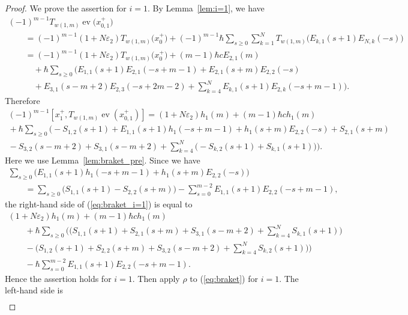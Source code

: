 \documentclass[10pt,a4paper]{amsart}
\theoremstyle{definition}
\numberwithin{equation}{section}
\DeclareMathOperator{\ev}{ev}
\newcommand{\ve}{\varepsilon}
\begin{document}
\begin{proof}We prove the assertion for $i=1$. By Lemma~\ref{lem:i=1}, we have
\begin{gather*}
(-1)^{m-1}T_{w(1,m)}\ev\big(x_{0,1}^+\big) \\
 \qquad{} = (-1)^{m-1}(1+N\ve_2)T_{w(1,m)}\big(x_0^+\big) + (-1)^{m-1}\hbar \sum_{s \geq 0} \sum_{k=1}^N T_{w(1,m)}\big(E_{k,1}(s+1)E_{N,k}(-s)\big) \\
\qquad{} =(-1)^{m-1}(1+N\ve_2)T_{w(1,m)}\big(x_0^+\big) + (m-1)\hbar c E_{2,1}(m)\\
\qquad \quad{} + \hbar \sum_{s \geq 0} \bigg( E_{1,1}(s+1)E_{2,1}(-s+m-1) + E_{2,1}(s+m)E_{2,2}(-s) \\
 \qquad \quad{}+ E_{3,1}(s-m+2)E_{2,3}(-s+2m-2) + \sum_{k=4}^N E_{k,1}(s+1)E_{2,k}(-s+m-1) \bigg).
\end{gather*}
Therefore
\begin{gather}
(-1)^{m-1} [x_1^+, T_{w(1,m)} \ev(x_{0,1}^+)] = (1+N\ve_2)h_1(m) + (m-1)\hbar c h_1(m) \nonumber\\
{}+ \hbar \sum_{s \geq 0} \bigg( {-}S_{1,2}(s+1) + E_{1,1}(s+1)h_1(-s+m-1) + h_1(s+m)E_{2,2}(-s) + S_{2,1}(s+m)\nonumber\\
{}-S_{3,2}(s-m+2) + S_{3,1}(s-m+2) + \sum_{k=4}^N \big( {-}S_{k,2}(s+1) + S_{k,1}(s+1) \big) \bigg). \label{eq:braket_i=1}
\end{gather}
Here we use Lemma~\ref{lem:braket_pre}. Since we have
\begin{gather*}
\sum_{s \geq 0} \big( E_{1,1}(s+1)h_1(-s+m-1) + h_1(s+m)E_{2,2}(-s) \big)\\
\qquad {}=\sum_{s \geq 0} \big( S_{1,1}(s+1)-S_{2,2}(s+m) \big) - \sum_{s=0}^{m-2} E_{1,1}(s+1)E_{2,2}(-s+m-1),
\end{gather*}
the right-hand side of (\ref{eq:braket_i=1}) is equal to
\begin{gather*}
(1+N\ve_2)h_1(m) + (m-1)\hbar c h_1(m) \\
\qquad{} + \hbar \sum_{s \geq 0} \bigg( \bigg( S_{1,1}(s+1) + S_{2,1}(s+m) + S_{3,1}(s-m+2) + \sum_{k=4}^N S_{k,1}(s+1) \bigg) \\
\qquad{} - \bigg( S_{1,2}(s+1) + S_{2,2}(s+m) + S_{3,2}(s-m+2) + \sum_{k=4}^N S_{k,2}(s+1) \bigg) \bigg)\\
\qquad{} - \hbar \sum_{s=0}^{m-2} E_{1,1}(s+1)E_{2,2}(-s+m-1).
\end{gather*}
Hence the assertion holds for $i=1$. Then apply $\rho$ to (\ref{eq:braket}) for $i=1$. The left-hand side is
\begin{gather*}

\end{gather*}
\end{proof}
\end{document}
